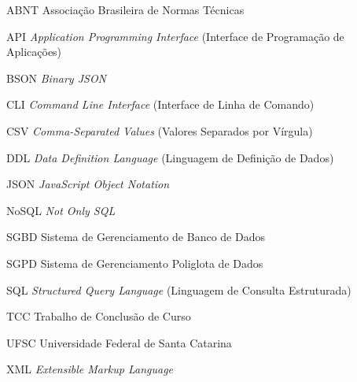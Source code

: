 \documentclass[
  12pt,
  oneside,
  a4paper,
  chapter=TITLE,
  section=TITLE,
  english,
  brazil,
]{abntex2}
\begin{document}
\begin{siglas}
  \item[ABNT] Associação Brasileira de Normas Técnicas
  \item[API] \textit{Application Programming Interface} (Interface de Programação de Aplicações)
  \item[BSON] \textit{Binary JSON}
  \item[CLI] \textit{Command Line Interface} (Interface de Linha de Comando)
  \item[CSV] \textit{Comma-Separated Values} (Valores Separados por Vírgula)
  \item[DDL] \textit{Data Definition Language} (Linguagem de Definição de Dados)
  \item[JSON] \textit{JavaScript Object Notation}
  \item[NoSQL] \textit{Not Only SQL}
  \item[SGBD] Sistema de Gerenciamento de Banco de Dados
  \item[SGPD] Sistema de Gerenciamento Poliglota de Dados
  \item[SQL] \textit{Structured Query Language} (Linguagem de Consulta Estruturada)
  \item[TCC] Trabalho de Conclusão de Curso
  \item[UFSC] Universidade Federal de Santa Catarina
  \item[XML] \textit{Extensible Markup Language}
\end{siglas}

\tableofcontents*
\cleardoublepage

\textual








\postextual

\renewcommand{\bibname}{Referências}


\begin{apendicesenv}
\partapendices

\end{apendicesenv}

\printindex
\end{document}
